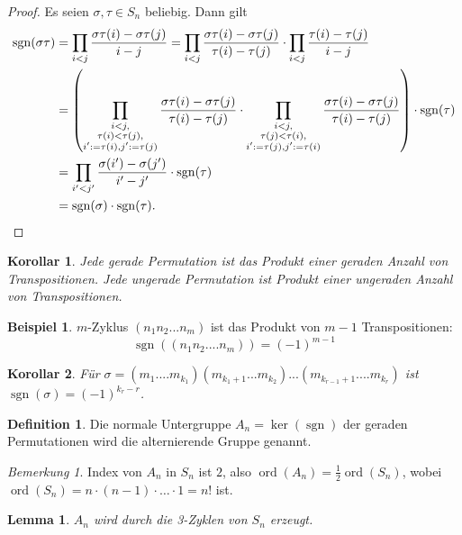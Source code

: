 \documentclass[12pt]{scrartcl} %
\DeclareMathOperator{\ord}{ord}
\DeclareMathOperator{\sgn}{sgn}
\newtheorem{lemma}{Lemma}
\newtheorem{kor}{Korollar}
\theoremstyle{definition}
\newtheorem*{defn}{Definition}
\newtheorem{ex}{Beispiel}
\theoremstyle{remark}
\newtheorem*{nb}{Bemerkung}
\begin{document}
\begin{proof}
	Es seien $\sigma,\tau\in S_n$ beliebig. Dann gilt 
	\begin{align*}
		\sgn(\sigma\tau) &= \prod_{i<j}\frac{\sigma\tau(i)-\sigma\tau(j)}{i-j} = \prod_{i<j}\frac{\sigma\tau(i)-\sigma\tau(j)}{\tau(i)-\tau(j)}\cdot\prod_{i<j}\frac{\tau(i)-\tau(j)}{i-j} \\
		&= \left(\prod_{\substack{i<j,\\\tau(i)<\tau(j),\\ i':=\tau(i),j':=\tau(j)}}\frac{\sigma\tau(i)-\sigma\tau(j)}{\tau(i)-\tau(j)}\cdot \prod_{\substack{i<j,\\\tau(j)<\tau(i),\\ i':=\tau(j),j':=\tau(i)}}\frac{\sigma\tau(i)-\sigma\tau(j)}{\tau(i)-\tau(j)}\right)\cdot \sgn(\tau) \\
		&=\prod_{i'<j'}\frac{\sigma(i')-\sigma(j')}{i'-j'}\cdot \sgn(\tau) \\
		&= \sgn(\sigma)\cdot \sgn(\tau).\qedhere
	\end{align*}
\end{proof}

\begin{kor}
	Jede gerade Permutation ist das Produkt einer geraden Anzahl von Transpositionen. Jede ungerade Permutation ist Produkt einer ungeraden Anzahl von Transpositionen.
\end{kor}

\begin{ex}
	\(m\)-Zyklus $(n_1n_2...n_m)$ ist das Produkt von $m-1$ Transpositionen:
	\[\sgn((n_1n_2....n_m))=(-1)^{m-1}\]
\end{ex}

\begin{kor}
	Für $\sigma = (m_1....m_{k_1})(m_{k_1+1}...m_{k_2})...(m_{k_{r-1}+1}....m_{k_r})$ ist $\sgn(\sigma)=(-1)^{k_r-r}$.
\end{kor}

\begin{defn}
	Die normale Untergruppe $A_n=\ker(\sgn)$ der geraden Permutationen wird die alternierende Gruppe genannt.
\end{defn}
	
\begin{nb}
	Index von $A_n$ in $S_n$ ist \(2\), also \(\ord(A_n)=\frac{1}{2}\ord(S_n)\), wobei $\ord(S_n)=n\cdot(n-1)\cdot\ldots\cdot1=n!$ ist.
\end{nb}
	
\begin{lemma}
	$A_n$ wird durch die 3-Zyklen von $S_n$ erzeugt.
\end{lemma}
	
\end{document}
